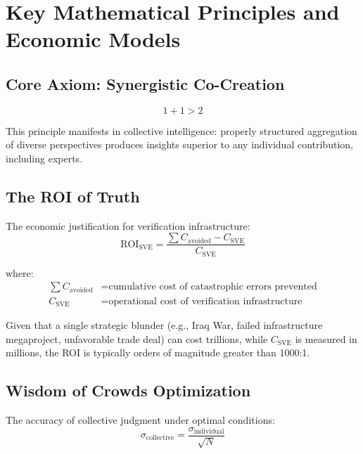 \documentclass[11pt,a4paper]{article}
\begin{document}
\vspace{1cm}

\section*{Key Mathematical Principles and Economic Models}

\subsection*{Core Axiom: Synergistic Co-Creation}
\begin{equation}
1 + 1 > 2
\label{eq:synergy}
\end{equation}

\noindent This principle manifests in collective intelligence: properly structured aggregation of diverse perspectives produces insights superior to any individual contribution, including experts.

\subsection*{The ROI of Truth}
The economic justification for verification infrastructure:
\begin{equation}
\text{ROI}_{\text{SVE}} = \frac{\sum C_{\text{avoided}} - C_{\text{SVE}}}{C_{\text{SVE}}}
\label{eq:roi}
\end{equation}

where:
\begin{align*}
\sum C_{\text{avoided}} &= \text{cumulative cost of catastrophic errors prevented} \\
C_{\text{SVE}} &= \text{operational cost of verification infrastructure}
\end{align*}

\noindent Given that a single strategic blunder (e.g., Iraq War, failed infrastructure megaproject, unfavorable trade deal) can cost trillions, while $C_{\text{SVE}}$ is measured in millions, the ROI is typically orders of magnitude greater than 1000:1.

\subsection*{Wisdom of Crowds Optimization}
The accuracy of collective judgment under optimal conditions:
\begin{equation}
\sigma_{\text{collective}} = \frac{\sigma_{\text{individual}}}{\sqrt{N}}
\label{eq:wisdom}
\end{equation}
\end{document}
